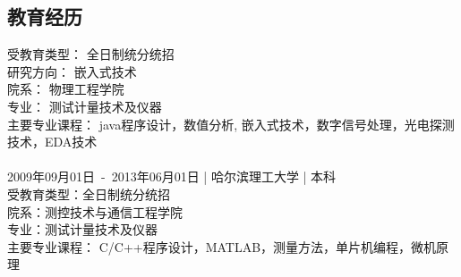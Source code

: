 \documentclass[12pt]{ctexart}
\begin{document}
\subsection{教育经历}
\label{sec-1-3}
受教育类型： 全日制统分统招\\
研究方向： 嵌入式技术\\
院系： 物理工程学院\\
专业： 测试计量技术及仪器\\
主要专业课程： java程序设计，数值分析, 嵌入式技术，数字信号处理，光电探测技术，EDA技术\\
\\
2009年09月01日\ -\ 2013年06月01日 | 哈尔滨理工大学 | 本科\\
受教育类型：全日制统分统招\\
院系：测控技术与通信工程学院\\
专业：测试计量技术及仪器\\
主要专业课程： C/C++程序设计，MATLAB，测量方法，单片机编程，微机原理\\
\end{document}
